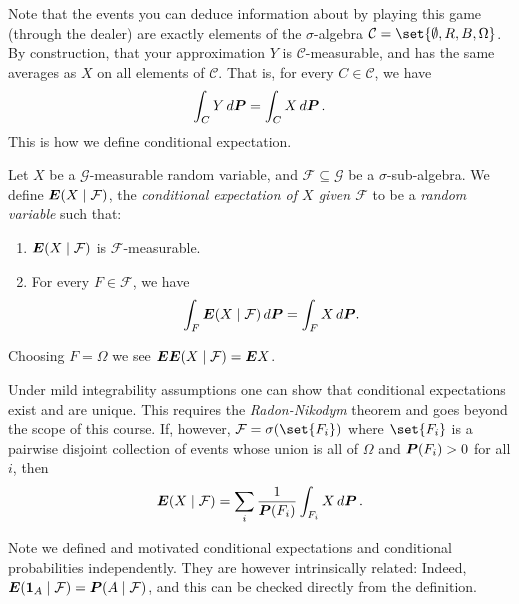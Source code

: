 Note that the events you can deduce information about by playing this game (through the dealer) are exactly elements of the $\sigma$-algebra $\mathcal C = \set{\emptyset, R, B, \Omega}$.
By construction, that your approximation $Y$ is $\mathcal C$-measurable, and has the same averages as $X$ on all elements of $\mathcal C$.
That is, for every $C \in \mathcal C$, we have
\begin{equation*}
  \int_C Y \, d\P = \int_C X \, d\P \,.
\end{equation*}
This is how we define conditional expectation.

\begin{definition}
  Let $X$ be a $\mathcal G$-measurable random variable, and $\mathcal F \subseteq \mathcal G$ be a $\sigma$-sub-algebra.
  We define $\E(X \given \mathcal F)$, the \emph{conditional expectation of $X$ given $\mathcal F$} to be a \emph{random variable} such that:
  \begin{enumerate}
    \item
      $\E( X \given \mathcal F)$ is $\mathcal F$-measurable.

    \item
      For every $F \in \mathcal F$, we have
      \begin{equation*}
	\int_F \E(X \given \mathcal F) \, d\P = \int_F X \, d\P.
      \end{equation*}
  \end{enumerate}
\end{definition}

\begin{remark}
  Choosing $F = \Omega$ we see $\E \E(X\given \mathcal F) = \E X$.
\end{remark}

\begin{remark}
  Under mild integrability assumptions one can show that conditional expectations exist and are unique.
  This requires the \emph{Radon-Nikodym} theorem and goes beyond the scope of this course.
  If, however, $\mathcal F = \sigma( \set{F_i} )$ where $\set{F_i}$ is a pairwise disjoint collection of events whose union is all of $\Omega$ and $\P(F_i) > 0 $ for all $i$, then
  \begin{equation*}
    \E( X \given \mathcal F)
      = \sum_i \frac{1}{\P(F_i)} \int_{F_i} X \, d\P \,.
  \end{equation*}
\end{remark}

\begin{remark}
  Note we defined and motivated conditional expectations and conditional probabilities independently.
  They are however intrinsically related:
  Indeed, $\E( \one_A \given \mathcal F) = \P( A \given \mathcal F)$, and this can be checked directly from the definition.
\end{remark}


